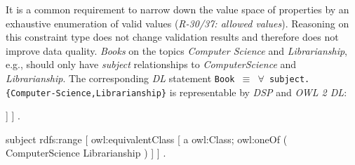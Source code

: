 \documentclass{acm_proc_article-sp}
\newcommand{\ms}[1]{%
  \texttt{#1}
}
\newenvironment{DL}{
  \vspace{0cm}
  \begin{tabular}{l l}

}{
  \end{tabular}
}
\begin{document}
%
%
It is a common requirement to narrow down the value space of properties by an exhaustive enumeration of valid values (\emph{R-30/37: allowed values}). 
Reasoning on this constraint type does not change validation results and therefore does not improve data quality.
\emph{Books} on the topics \emph{Computer Science} and \emph{Librarianship}, e.g., should only have \emph{subject} relationships to \emph{ComputerScience} and \emph{Librarianship}.
The corresponding \emph{DL} statement {\small\ms{Book $\equiv$ $\forall$ subject.\{Computer-Science,Librarianship\}}}
is representable by \emph{DSP} and \emph{OWL 2 DL}:
\begin{ex}
[ a dsp:DescriptionTemplate ;
  dsp:resourceClass Book ; 
  dsp:statementTemplate [ 
    dsp:property subject ; 
    dsp:nonLiteralConstraint [ 
      dsp:valueURI ComputerScience, Librarianship ] ] ] .

subject rdfs:range [ owl:equivalentClass [ a owl:Class;
    owl:oneOf ( ComputerScience Librarianship ) ] ] .
\end{ex}
\end{document}
